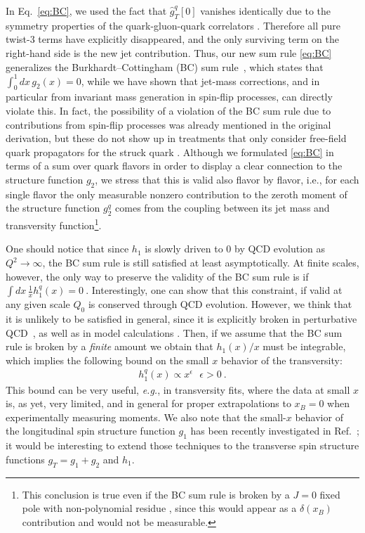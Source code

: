 \documentclass[preprintnumbers,floatfix,nofootinbib]{revtex4}
\newcommand{\xbj}{{x_B}}                   %
\newcommand{\eg}{{\em e.g.}}
\begin{document}
In Eq.~\eqref{eq:BC}, we used the fact that $\widehat g_T^q[0]$ vanishes identically due to the symmetry properties of the quark-gluon-quark correlators \cite{Accardi:2009au}.
Therefore all pure twist-3 terms have explicitly disappeared, and the only surviving term on the right-hand side is the new jet contribution.
Thus, our new sum rule \eqref{eq:BC}
generalizes the Burkhardt--Cottingham (BC) sum rule~\cite{Burkhardt:1970ti},
which states that  $\int_0^1 dx\, g_2(x) =0$, while we have shown that jet-mass corrections, and in particular from invariant mass generation in spin-flip processes, can directly violate this.
In fact, the possibility of a violation of the BC sum rule due to 
contributions from spin-flip processes was already mentioned in the original
derivation, but these do not show up in treatments that only
consider free-field quark propagators for the struck quark
\cite{Jaffe:1996zw}.  Although we formulated \eqref{eq:BC} in terms of a sum over quark flavors in order to display a clear
connection to the structure function $g_2$, we stress that this is valid also
flavor by flavor, i.e., for each single flavor the only measurable nonzero contribution to the zeroth moment of the
structure function $g_2^q$ comes from the coupling between its jet mass and transversity function\footnote{This conclusion is true even if the BC sum rule is broken by a $J = 0$ fixed pole with
non-polynomial residue \cite{Jaffe:1996zw}, since this would appear as a
$\delta(\xbj)$ contribution and would not be measurable.}.

One should notice that since $h_1$ is slowly driven to 0 by QCD evolution as $Q^2 \to \infty$, the BC sum rule is still satisfied at least
asymptotically.
At finite scales, however, the only way to preserve the validity of the
BC sum rule is if
$
   \int dx\, \frac{1}{x} h_1^q(x) = 0 \ .
\label{eq:ABsumrule}
$
Interestingly, one can show that this constraint, if valid at any given scale
$Q_0$ is conserved through QCD evolution. However, we think that it is unlikely to be satisfied in general, since it is explicitly broken in perturbative QCD~\cite{Kundu:2001pk}, as well as in model calculations \cite{Schweitzer:2001sr,Wakamatsu:2007nc,Pasquini:2005dk,Cloet:2007em,Bacchetta:2008af,Bourrely:2010ng}. Then, if we assume that the BC sum rule is broken by a {\em finite} amount we obtain that $h_1(x)/x$ must be integrable, which implies the following bound on the small $x$ behavior of the transversity: 
\begin{align}
  h_1^q(x) \propto x^\epsilon \ \ \ \epsilon>0 \ .
\label{eq:ABbound}
\end{align}
This bound can be very useful, \eg, in transversity fits, where the data at
small $x$ is, as yet, very limited, and in general for proper extrapolations
to $x_B=0$ when experimentally measuring moments. We also note that the small-$x$ behavior of the longitudinal spin structure function $g_1$ has been recently investigated in Ref.~\cite{Kovchegov:2016zex}; it would be interesting to extend those techniques to the transverse spin structure functions $g_T=g_1+g_2$ and $h_1$.
\end{document}
